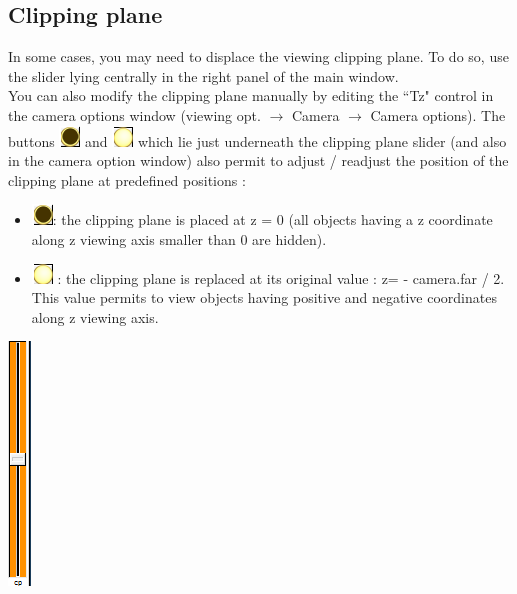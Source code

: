 \subsection{Clipping plane}

\begin{minipage}{0.7\textwidth}
In some cases, you may need to displace the viewing clipping plane. To do so, use
the slider lying centrally in the right panel of the main window.\\
You can also modify the clipping plane manually by editing the ``Tz" control in
the camera options window (viewing opt. $\rightarrow$ Camera $\rightarrow$ Camera options).
The buttons \includegraphics[scale=0.7]{images/Icons/clipping_plane3.png} and \includegraphics[scale=0.7]{images/Icons/clipping_plane2.png} which lie just underneath the clipping plane slider (and
also in the camera option window) also permit to adjust / readjust the position of
the clipping plane at predefined positions :
\begin{itemize}
\item  \includegraphics[scale=0.7]{images/Icons/clipping_plane3.png}: the clipping plane is placed at z = 0 (all objects having a z coordinate along
z viewing axis smaller than 0 are hidden).
\item	\includegraphics[scale=0.7]{images/Icons/clipping_plane2.png} : the clipping plane is replaced at its original value : z= - camera.far / 2. This value permits to
view objects having positive and negative coordinates along z viewing axis.

\end{itemize}
\end{minipage}    
\begin{minipage}{0.25\textwidth}\centering
  \includegraphics[scale=0.5]{images/Icons/clipping_plane.png}
 \end{minipage}   




